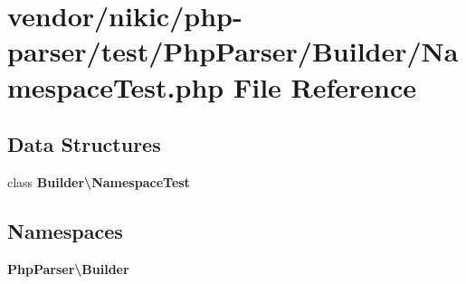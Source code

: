 \section{vendor/nikic/php-\/parser/test/\+Php\+Parser/\+Builder/\+Namespace\+Test.php File Reference}
\label{nikic_2php-parser_2test_2_php_parser_2_builder_2_namespace_test_8php}
\subsection*{Data Structures}
\begin{DoxyCompactItemize}
\item 
class {\bf Builder\textbackslash{}\+Namespace\+Test}
\end{DoxyCompactItemize}
\subsection*{Namespaces}
\begin{DoxyCompactItemize}
\item 
 {\bf Php\+Parser\textbackslash{}\+Builder}
\end{DoxyCompactItemize}
